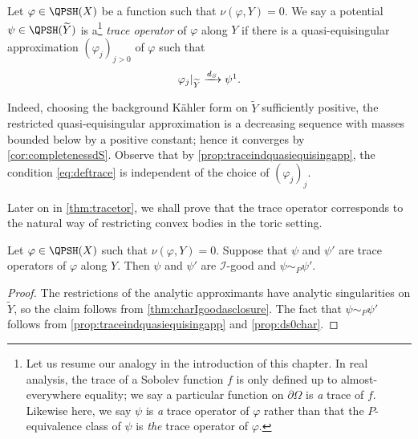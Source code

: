 \begin{definition}\label{def:traceop}
    Let $\varphi\in \QPSH(X)$ be a function such that $\nu(\varphi,Y)=0$. We say a potential $\psi\in \QPSH(\widetilde{Y})$ is a\footnote{Let us resume our analogy in the introduction of this chapter.
In real analysis, the trace of a Sobolev function $f$ is only defined up to almost-everywhere equality; we say a particular function on $\partial\Omega$ is \emph{a} trace of $f$. Likewise here, we say $\psi$ is \emph{a} trace operator of $\varphi$ rather than that the $P$-equivalence class of $\psi$ is \emph{the} trace operator of $\varphi$.} \emph{trace operator} of $\varphi$ along $Y$ if there is a quasi-equisingular approximation $(\varphi_j)_{j>0}$ of $\varphi$ such that
    \begin{equation}\label{eq:deftrace}
        \varphi_j|_{\widetilde{Y}}\xrightarrow{d_S}\psi\footnotemark.
    \end{equation}
\end{definition}
Indeed, choosing the background Kähler form on $\widetilde{Y}$ sufficiently positive, the restricted quasi-equisingular approximation is a decreasing sequence with masses bounded below by a positive constant; hence it converges by \cref{cor:completenessdS}.
Observe that by \cref{prop:traceindquasiequisingapp}, the condition \eqref{eq:deftrace} is independent of the choice of $(\varphi_j)_j$.

Later on in \cref{thm:tracetor}, we shall prove that the trace operator corresponds to the natural way of restricting convex bodies in the toric setting.

\begin{proposition}\label{prop:traceunique}
    Let $\varphi\in \QPSH(X)$ such that $\nu(\varphi,Y)=0$. Suppose that $\psi$ and $\psi'$ are trace operators of $\varphi$ along $Y$. Then $\psi$ and $\psi'$ are $\mathcal{I}$-good and $\psi\sim_P\psi'$.
\end{proposition}
\begin{proof}
    The restrictions of the analytic approximants have analytic singularities on $\widetilde{Y}$, so the claim follows from \cref{thm:charIgoodasclosure}. The fact that $\psi\sim_P\psi'$ follows from \cref{prop:traceindquasiequisingapp} and \cref{prop:ds0char}.
\end{proof}

